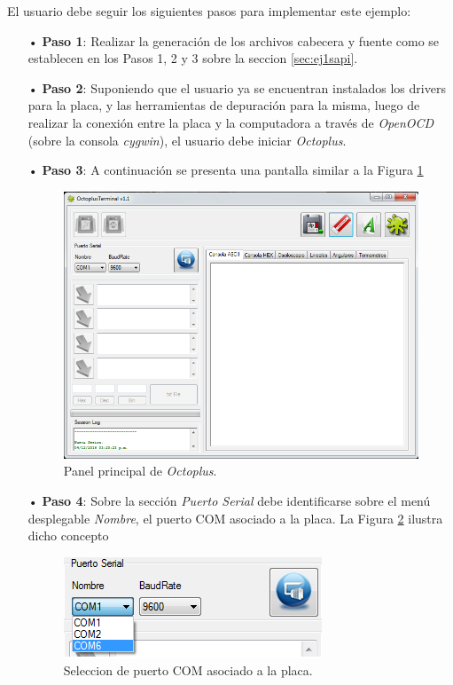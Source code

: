\documentclass[12pt,letterpaper]{article}
\begin{document}
El usuario debe seguir los siguientes pasos para implementar este ejemplo:
\begin{enumerate}
\item[•]\textbf{Paso 1}: Realizar la generación de los archivos cabecera y fuente como se establecen en los Pasos 1, 2 y 3 sobre la seccion \ref{sec:ej1sapi}.
\item[•]\textbf{Paso 2}: Suponiendo que el usuario ya se encuentran instalados los drivers para la placa, y las herramientas de depuración para la misma, luego de realizar la conexión entre la placa y la computadora a través de \textit{OpenOCD} (sobre la consola \textit{cygwin}), el usuario debe iniciar \textit{Octoplus}.
\item[•]\textbf{Paso 3}: A continuación se presenta una pantalla similar a la Figura \ref{Fig29}


\begin{figure}[H]
\centering
\includegraphics[width=6 cm]{figuras/f11.png}
\caption{Panel principal de \textit{Octoplus}.}
\label{Fig29}
\end{figure}


\item[•]\textbf{Paso 4}: Sobre la sección \textit{Puerto Serial} debe identificarse sobre el menú desplegable \textit{Nombre}, el puerto COM asociado a la placa. La Figura \ref{Fig30} ilustra dicho concepto


\begin{figure}[!h]
\centering
\includegraphics[width=4 cm]{figuras/f12.png}
\caption{Seleccion de puerto COM asociado a la placa.}
\label{Fig30}
\end{figure}


\end{enumerate}
\end{document}
